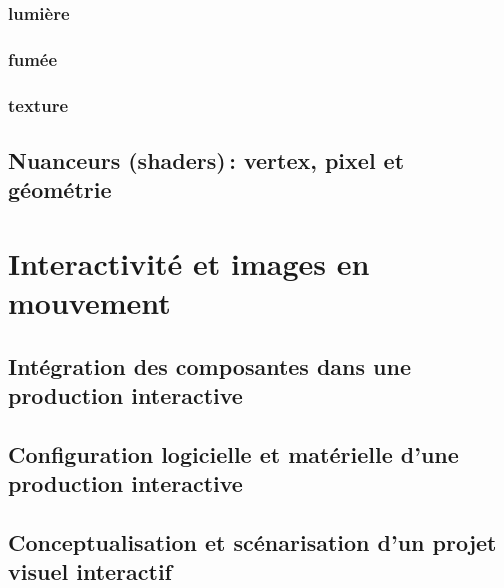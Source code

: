 \documentclass[
]{book}
\begin{document}
\hypertarget{lumiuxe8re}{%
\subsection{lumière}\label{lumiuxe8re}}

\hypertarget{fumuxe9e}{%
\subsection{fumée}\label{fumuxe9e}}

\hypertarget{texture-1}{%
\subsection{texture}\label{texture-1}}

\hypertarget{nuanceurs-shaders-vertex-pixel-et-guxe9omuxe9trie}{%
\section{Nuanceurs (shaders)\,: vertex, pixel et géométrie}\label{nuanceurs-shaders-vertex-pixel-et-guxe9omuxe9trie}}

\hypertarget{interagir}{%
\chapter{Interactivité et images en mouvement}\label{interagir}}

\hypertarget{intuxe9gration-des-composantes-dans-une-production-interactive}{%
\section{Intégration des composantes dans une production interactive}\label{intuxe9gration-des-composantes-dans-une-production-interactive}}

\hypertarget{configuration-logicielle-et-matuxe9rielle-dune-production-interactive}{%
\section{Configuration logicielle et matérielle d'une production interactive}\label{configuration-logicielle-et-matuxe9rielle-dune-production-interactive}}

\hypertarget{conceptualisation-et-scuxe9narisation-dun-projet-visuel-interactif}{%
\section{Conceptualisation et scénarisation d'un projet visuel interactif}\label{conceptualisation-et-scuxe9narisation-dun-projet-visuel-interactif}}
\end{document}
